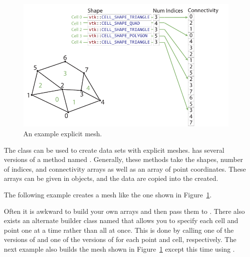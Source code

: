 \begin{figure}[htb]
  \centering
  \includegraphics{images/ExplicitCellConnections}
  \caption{An example explicit mesh.}
  \label{fig:ExplicitMesh}
\end{figure}

The  class can be used to create data sets
with explicit meshes.  has several
versions of a method named . Generally, these methods take
the shapes, number of indices, and connectivity arrays as well as an array
of point coordinates. These arrays can be given in 
objects, and the data are copied into the  created.

The following example creates a mesh like the one shown in
Figure~\ref{fig:ExplicitMesh}.


Often it is awkward to build your own arrays and then pass them to
. There also exists an alternate
builder class named  that allows
you to specify each cell and point one at a time rather than all at once.
This is done by calling one of the versions of  and one
of the versions of  for each point and cell,
respectively. The next example also builds the mesh shown in
Figure~\ref{fig:ExplicitMesh} except this time using
.


